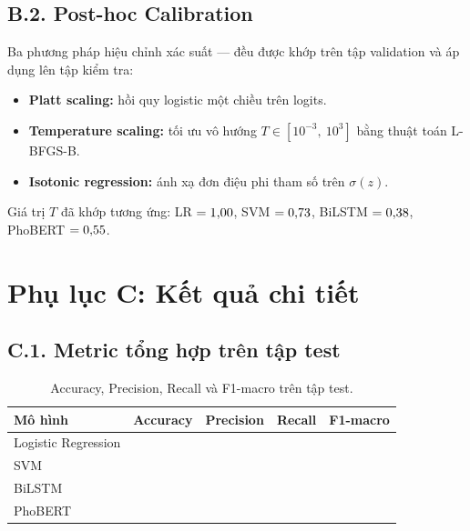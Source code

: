 \subsection*{B.2. Post-hoc Calibration}

Ba phương pháp hiệu chỉnh xác suất --- đều được khớp trên tập validation và áp dụng lên tập kiểm tra:

\begin{itemize}[leftmargin=2em,itemsep=2pt]
  \item \textbf{Platt scaling:} hồi quy logistic một chiều trên logits.
  \item \textbf{Temperature scaling:} tối ưu vô hướng $T \in [10^{-3},\ 10^{3}]$ bằng thuật toán L-BFGS-B.
  \item \textbf{Isotonic regression:} ánh xạ đơn điệu phi tham số trên $\sigma(z)$.
\end{itemize}

Giá trị $T$ đã khớp tương ứng: LR $=1{,}00{}$, SVM $=0{,}73{}$, BiLSTM $=0{,}38{}$, PhoBERT $=0{,}55{}$.

\section*{Phụ lục C: Kết quả chi tiết}

\subsection*{C.1. Metric tổng hợp trên tập test}

\begin{table}[H]
  \centering
  \small
  \caption[Metric tổng hợp trên tập test]{Accuracy, Precision, Recall và F1-macro trên tập test.}
  \label{tab:appendix_full_metrics}
  \begin{tabular}{l c c c c}
    \toprule
    \textbf{Mô hình} & \textbf{Accuracy} & \textbf{Precision} & \textbf{Recall} & \textbf{F1-macro} \\
    \midrule
    Logistic Regression & \lracctab{} & \lrprectab{} & \lrrectab{} & \lrfonetab{} \\
    SVM                 & \svmacctab{} & \svmprectab{} & \svmrectab{} & \svmfonetab{} \\
    BiLSTM              & \bilstmacctab{} & \bilstmprectab{} & \bilstmrectab{} & \bilstmfonetab{} \\
    PhoBERT             & \phobertacctab{} & \phobertprectab{} & \phobertrectab{} & \phobertfonetab{} \\
    \bottomrule
  \end{tabular}
\end{table}

